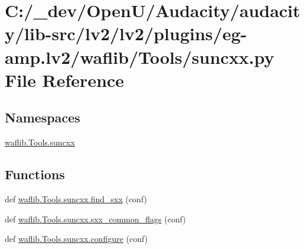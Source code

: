 \hypertarget{lv2_2plugins_2eg-amp_8lv2_2waflib_2_tools_2suncxx_8py}{}\section{C\+:/\+\_\+dev/\+Open\+U/\+Audacity/audacity/lib-\/src/lv2/lv2/plugins/eg-\/amp.lv2/waflib/\+Tools/suncxx.py File Reference}
\label{lv2_2plugins_2eg-amp_8lv2_2waflib_2_tools_2suncxx_8py}
\subsection*{Namespaces}
\begin{DoxyCompactItemize}
\item 
 \hyperlink{namespacewaflib_1_1_tools_1_1suncxx}{waflib.\+Tools.\+suncxx}
\end{DoxyCompactItemize}
\subsection*{Functions}
\begin{DoxyCompactItemize}
\item 
def \hyperlink{namespacewaflib_1_1_tools_1_1suncxx_a88c1361f04aec9dca5a65944c5c06cb9}{waflib.\+Tools.\+suncxx.\+find\+\_\+sxx} (conf)
\item 
def \hyperlink{namespacewaflib_1_1_tools_1_1suncxx_abf9e33c219f7edbbb25eb5360ecf7089}{waflib.\+Tools.\+suncxx.\+sxx\+\_\+common\+\_\+flags} (conf)
\item 
def \hyperlink{namespacewaflib_1_1_tools_1_1suncxx_a07c4b17184f93e69ac10e64f97a20ace}{waflib.\+Tools.\+suncxx.\+configure} (conf)
\end{DoxyCompactItemize}
